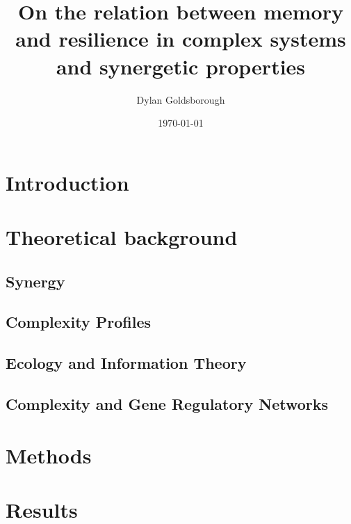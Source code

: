 \documentclass{article}
\title{On the relation between memory and resilience in complex systems and synergetic properties}
\author{Dylan Goldsborough}
\date{\today}
\begin{document}
\maketitle



\section{Introduction}



\section{Theoretical background}

\subsection{Synergy}



\subsection{Complexity Profiles}



\subsection{Ecology and Information Theory}


\subsection{Complexity and Gene Regulatory Networks}



\section{Methods}



\section{Results}
\end{document}
